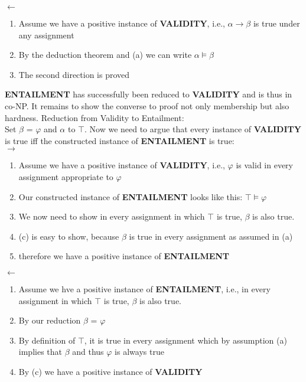 \documentclass [11pt]{article}
\begin{document}
{  $\leftarrow$
  \begin{enumerate}
    \item{Assume we have a positive instance of \textbf{VALIDITY}, i.e., $\alpha \rightarrow \beta$ is true under any assignment}
    \item{By the deduction theorem and (a) we can write $\alpha \models \beta$ }
    \item{The second direction is proved}
  \end{enumerate}
  \textbf{ENTAILMENT} has successfully been reduced to \textbf{VALIDITY} and is thus in co-NP. It remains to show the converse to proof not only membership but also hardness.
  \noindent 
  Reduction from Validity to Entailment:\\
  Set $\beta$ = $\varphi$ and $\alpha$ to $\top$.
  Now we need to argue that every instance of \textbf{VALIDITY} is true iff the constructed instance of \textbf{ENTAILMENT} is true:\\
  $\rightarrow$\\
  \begin{enumerate}
    \item{Assume we have a positive instance of \textbf{VALIDITY}, i.e., $\varphi$ is valid in every assignment appropriate to $\varphi$}
    \item{Our constructed instance of \textbf{ENTAILMENT} looks like this: $\top \models \varphi$}
    \item{We now need to show in every assignment in which $\top$ is true, $\beta$ is also true.}
    \item{(c) is easy to show, because $\beta$ is true in every assignment as assumed in (a)}
    \item{therefore we have a positive instance of \textbf{ENTAILMENT}}
  \end{enumerate}
  $\leftarrow$\\
  \begin{enumerate}
    \item{Assume we hve a positive instance of \textbf{ENTAILMENT}, i.e., in every assignment in which $\top$ is true, $\beta$ is also true.}
    \item{By our reduction $\beta$ = $\varphi$}
    \item{By definition of $\top$, it is true in every assignment which by assumption (a) implies that $\beta$ and thus $\varphi$ is always true}
    \item{By (c) we have a positive instance of \textbf{VALIDITY}}
  \end{enumerate}
}
\end{document}
